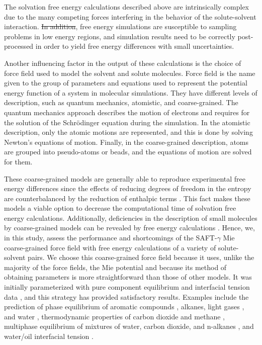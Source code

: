 \documentclass[
	12pt,				%
	openany,			%
	oneside,			%
	a4paper,			%
	english,			%
	brazil				%
	]{abntex2}
\providecommand{\DIFadd}[1]{{\protect\color{blue}\uwave{#1}}}
\providecommand{\DIFdel}[1]{{\protect\color{red}\sout{#1}}}
\providecommand{\DIFaddbegin}{}
\providecommand{\DIFaddend}{}
\providecommand{\DIFdelbegin}{}
\providecommand{\DIFdelend}{}
\providecommand{\DIFadd}[1]{{\protect\color{blue}\uwave{#1}}} %
\providecommand{\DIFdel}[1]{{\protect\color{red}\sout{#1}}}                      %
\providecommand{\DIFaddbegin}{} %
\providecommand{\DIFaddend}{} %
\providecommand{\DIFdelbegin}{} %
\providecommand{\DIFdelend}{} %
\begin{document}
The solvation free energy calculations described above are intrinsically complex due to the many competing forces interfering in the behavior of the solute-solvent interaction. \DIFdelbegin \DIFdel{In addition}\DIFdelend \DIFaddbegin \DIFadd{Also}\DIFaddend , free energy simulations are susceptible to sampling problems in low energy regions, and simulation results need to be correctly post-processed in order to yield free energy differences with small uncertainties. {Another influencing factor in the output of these calculations is the choice of force field used to model the solvent and solute molecules. Force field is the name given to the group of parameters and equations used to represent the potential energy function of a system in molecular simulations. They have different levels of description, such as quantum mechanics, atomistic, and coarse-grained. The quantum mechanics approach describes the motion of electrons and requires for the solution of the Schr\"{o}dinger equation during the simulation. In the atomistic description, only the atomic motions are represented,  and this is done by solving Newton's equations of motion. Finally, in the coarse-grained description, atoms are grouped into pseudo-atoms or beads, and the equations of motion are solved for them. 

	These coarse-grained models are generally able to reproduce experimental free energy differences since the effects of reducing degrees of freedom in the entropy are counterbalanced by the reduction of enthalpic terms \cite{kmiecik2016}. This fact makes these models a viable option to decrease the computational time of solvation free energy calculations. Additionally, deficiencies in the description of small molecules by coarse-grained models can be revealed by free energy calculations \cite{mobley2007,shirts2013}. Hence, we, in this study, assess the performance and shortcomings of the SAFT-$\gamma$ Mie coarse-grained force field  \cite{avendano2011} with free energy calculations of a variety of solute-solvent pairs. We choose this coarse-grained force field because it uses, unlike the majority of the force fields, the Mie potential \cite{MIE} and because its method of obtaining parameters is more straightforward than those of other \DIFaddbegin \DIFadd{coarse-grained }\DIFaddend models. It was initially parameterized with pure component equilibrium and interfacial tension data \cite{avendano2011}, and this strategy has provided satisfactory results. Examples include the prediction of phase equilibrium of aromatic compounds \cite{muller2017}, alkanes, light gases \cite{herdes2015}, and water \cite{lobanova2015}, thermodynamic properties of carbon dioxide and methane \cite{cassiano1}, multiphase equilibrium of mixtures of water, carbon dioxide, and n-alkanes \cite{lobanova2016}, and water/oil interfacial tension \cite{herdes2017}.} 
\end{document}
